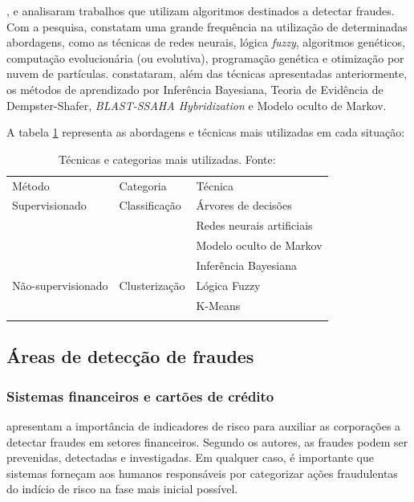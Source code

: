 \documentclass[smallextended]{svjour3}
\begin{document}
\cite{Pejic-Bach2010}, \cite{Wang2010} e \cite{Raj2011} analisaram trabalhos que utilizam algoritmos destinados a detectar fraudes. Com a pesquisa, constatam uma grande frequência na utilização de determinadas abordagens, como as técnicas de redes neurais, lógica \emph{fuzzy}, algoritmos genéticos, computação evolucionária (ou evolutiva), programação genética e otimização por nuvem de partículas. \cite{Raj2011} constataram, além das técnicas apresentadas anteriormente, os métodos de aprendizado por Inferência Bayesiana, Teoria de Evidência de Dempster-Shafer, \emph{BLAST-SSAHA Hybridization} e Modelo oculto de Markov.

A tabela \ref{tab:tecnologias} representa as abordagens e técnicas mais utilizadas em cada situação:

\begin{table}
	\caption{Técnicas e categorias mais utilizadas. Fonte: \cite{Abdallah2016}}
	\label{tab:tecnologias}       %
	\begin{tabular}[!Ht]{lll}
		\hline\noalign{\smallskip}
		Método & Categoria & Técnica  \\
		\noalign{\smallskip}\hline\noalign{\smallskip}
		Supervisionado & Classificação & Árvores de decisões \\
		 &  & Redes neurais artificiais \\
		 &  & Modelo oculto de Markov \\
		 &  &  Inferência Bayesiana\\
		Não-supervisionado & Clusterização & Lógica Fuzzy \\
		 &  & K-Means  \\
		\noalign{\smallskip}\hline
	\end{tabular}
\end{table}

\subsection{Áreas de detecção de fraudes}
	
\subsubsection{Sistemas financeiros e cartões de crédito}

\cite{Gullkvist2013} apresentam a importância de indicadores de risco para auxiliar as corporações a detectar fraudes em setores financeiros. Segundo os autores, as fraudes podem ser prevenidas, detectadas e investigadas. Em qualquer caso, é importante que sistemas forneçam aos humanos responsáveis por categorizar ações fraudulentas do indício de risco na fase mais inicial possível.
\end{document}
